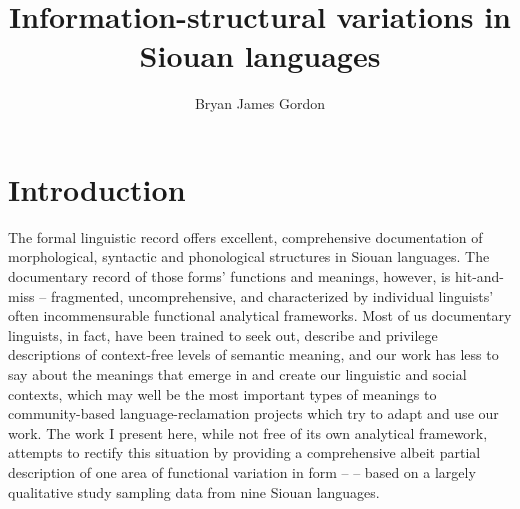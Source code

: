\documentclass[output=paper]{LSP/langsci}
\author{Bryan James Gordon}
\title{Information-structural variations in {Siouan} languages}
\begin{document}
\section{Introduction}

	The formal linguistic record offers excellent, comprehensive documentation of morphological, syntactic and phonological structures in Siouan languages. The documentary record of those forms’ functions and meanings, however, is hit-and-miss -- fragmented, uncomprehensive, and characterized by individual linguists’ often incommensurable functional analytical frameworks. Most of us documentary linguists, in fact, have been trained to seek out, describe and privilege descriptions of context-free levels of semantic meaning, and our work has less to say about the meanings that emerge in and create our linguistic and social contexts, which may well be the most important types of meanings to community-based language-reclamation projects which try to adapt and use our work. The work I present here, while not free of its own analytical framework, attempts to rectify this situation by providing a comprehensive albeit partial description of one area of functional variation in form --  -- based on a largely qualitative  study sampling data from nine Siouan languages.
	
\end{document}
